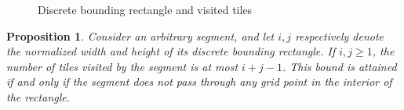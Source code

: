 \documentclass[12pt, a4paper]{article}
\newtheorem{proposition}{Proposition}%
\begin{document}
\begin{figure}
\centering%
\hfill%
%
\caption{Discrete bounding rectangle and visited tiles
}%
\label{fig: discrete bounding rectangle and touched tiles}%
\end{figure}%

\begin{proposition}
\label{prop: i+j-1}
Consider an arbitrary segment, and let $i, j$ respectively denote the normalized width and height of its discrete bounding rectangle. If $i, j \geq 1$, the number of tiles visited by the segment is at most $i+j-1$. This bound is attained if and only if the segment does not pass through any grid point in the interior of the rectangle.
\end{proposition}
\end{document}
